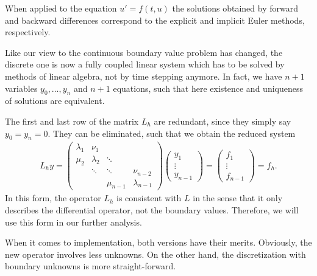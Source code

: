 \begin{remark}
  When applied to the equation $u'=f(t,u)$ the solutions obtained by
  forward and backward differences correspond to the explicit and
  implicit Euler methods, respectively.
\end{remark}





\begin{remark}
  Like our view to the continuous boundary value problem has changed,
  the discrete one is now a fully coupled linear system which has to
  be solved by methods of linear algebra, not by time stepping
  anymore. In fact, we have $n+1$ variables $y_0,\dots, y_n$ and $n+1$
  equations, such that here existence and uniqueness of solutions are
  equivalent.
\end{remark}



\begin{remark}
  The first and last row of the matrix $L_h$ are redundant, since they
  simply say $y_0 = y_n = 0$. They can be eliminated, such that we
  obtain the reduced system
  \begin{gather}
    \label{eq:fd:8}
    L_h y =
    \begin{pmatrix}
      \lambda_1 & \nu_1\\
      \mu_2 & \lambda_2 & \ddots \\
      & \ddots & \ddots & \nu_{n-2} \\
      &&\mu_{n-1}& \lambda_{n-1}
    \end{pmatrix}
    \begin{pmatrix}
      y_1\\\vdots\\y_{n-1}
    \end{pmatrix}
    =
    \begin{pmatrix}
      f_1 \\\vdots\\f_{n-1}
    \end{pmatrix} = f_h.
  \end{gather}
  In this form, the operator $L_h$ is consistent with $L$ in the sense
  that it only describes the differential operator, not the boundary
  values. Therefore, we will use this form in our further analysis.

  When it comes to implementation, both versions have their
  merits. Obviously, the new operator involves less unknowns. On the
  other hand, the discretization with boundary unknowns is more
  straight-forward.
\end{remark}

